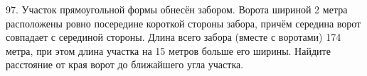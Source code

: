 97. Участок прямоугольной формы обнесён забором. Ворота шириной 2 метра расположены ровно посередине короткой стороны забора, причём середина ворот совпадает с серединой стороны. Длина всего забора (вместе с воротами) 174 метра, при этом длина участка на 15 метров больше его ширины. Найдите расстояние от края ворот до ближайшего угла участка.\\
